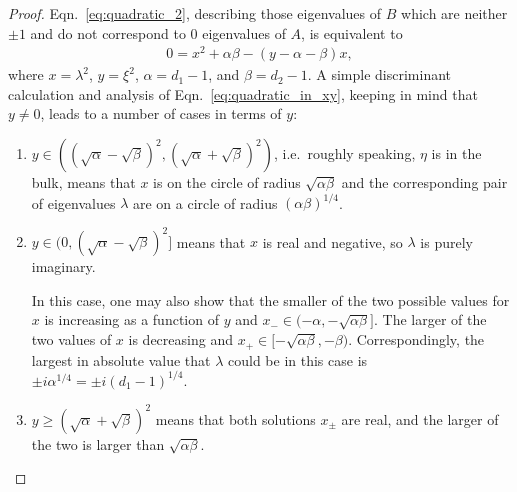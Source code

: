 \begin{proof}
Eqn.~\eqref{eq:quadratic_2}, describing those eigenvalues of $B$ which are neither $\pm 1$ and do not correspond to $0$ eigenvalues of $A$, is equivalent to
\begin{eqnarray} 
\label{eq:quadratic_in_xy}
0 = x^2 + \alpha \beta - (y - \alpha - \beta ) x,
\end{eqnarray}
where $x = \lambda^2$, $y = \xi^2$, $\alpha = d_1 - 1$, and $\beta = d_2 -1$. 
A simple discriminant calculation and analysis of 
Eqn.~\eqref{eq:quadratic_in_xy}, keeping in mind that $y \neq 0$,  
leads to a number of cases in terms of $y$:
\begin{enumerate}[{Case} 1:]
\item $y \in ((\sqrt{\alpha} -\sqrt{\beta})^2, (\sqrt{\alpha} + \sqrt{\beta})^2)$,
i.e.\ roughly speaking, $\eta$ is in the bulk,
means that $x$ is on the circle of radius $\sqrt{\alpha \beta}$ and the
corresponding pair of eigenvalues $\lambda$ are on a circle of radius 
$(\alpha \beta)^{1/4}$.

\item $y \in (0, (\sqrt{\alpha} - \sqrt{\beta})^2]$ means that $x$ is real and negative, so $\lambda$ is purely imaginary.

In this case, one may also show that the smaller of the two possible values 
for $x$ is increasing as a function of $y$ and
$x_{-} \in (-\alpha, -\sqrt{\alpha \beta}]$. 
The larger of the two values of $x$ is decreasing and $x_{+} \in [-\sqrt{\alpha \beta}, - \beta)$.
Correspondingly, the largest in absolute value that 
$\lambda$ could be in this case 
is $\pm i \alpha^{1/4} = \pm i (d_1-1)^{1/4}$. 

\item $y \geq (\sqrt{\alpha} + \sqrt{\beta})^2$ means that 
both solutions $x_{\pm}$ are real,
and the larger of the two is larger than $\sqrt{\alpha \beta}$.
\end{enumerate}


\end{proof}
